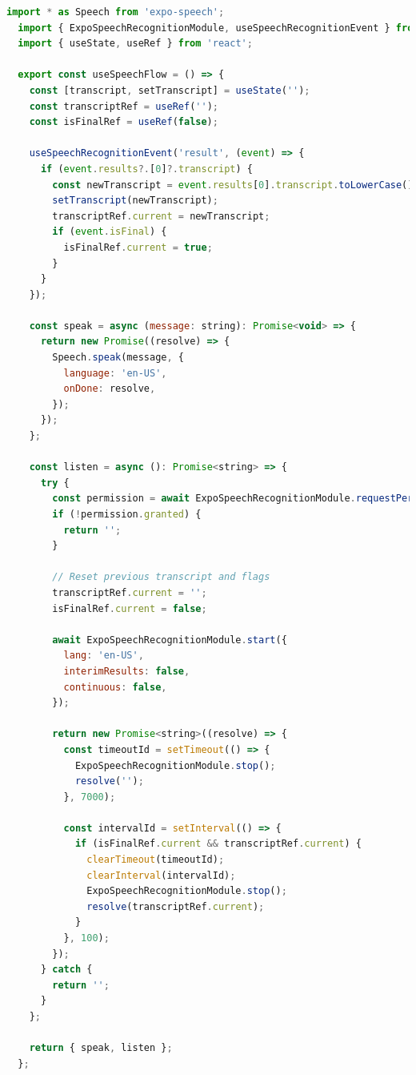 \begin{lstlisting}[language=JavaScript, caption=useSpeechFlowHook, label=lst:hook]
  import * as Speech from 'expo-speech';
  import { ExpoSpeechRecognitionModule, useSpeechRecognitionEvent } from 'expo-speech-recognition';
  import { useState, useRef } from 'react';
  
  export const useSpeechFlow = () => {
    const [transcript, setTranscript] = useState('');
    const transcriptRef = useRef('');
    const isFinalRef = useRef(false);
  
    useSpeechRecognitionEvent('result', (event) => {
      if (event.results?.[0]?.transcript) {
        const newTranscript = event.results[0].transcript.toLowerCase();
        setTranscript(newTranscript);
        transcriptRef.current = newTranscript;
        if (event.isFinal) {
          isFinalRef.current = true;
        }
      }
    });
  
    const speak = async (message: string): Promise<void> => {
      return new Promise((resolve) => {
        Speech.speak(message, {
          language: 'en-US',
          onDone: resolve,
        });
      });
    };
  
    const listen = async (): Promise<string> => {
      try {
        const permission = await ExpoSpeechRecognitionModule.requestPermissionsAsync();
        if (!permission.granted) {
          return '';
        }
  
        // Reset previous transcript and flags
        transcriptRef.current = '';
        isFinalRef.current = false;
  
        await ExpoSpeechRecognitionModule.start({
          lang: 'en-US',
          interimResults: false,
          continuous: false,
        });
  
        return new Promise<string>((resolve) => {
          const timeoutId = setTimeout(() => {
            ExpoSpeechRecognitionModule.stop();
            resolve('');
          }, 7000);
  
          const intervalId = setInterval(() => {
            if (isFinalRef.current && transcriptRef.current) {
              clearTimeout(timeoutId);
              clearInterval(intervalId);
              ExpoSpeechRecognitionModule.stop();
              resolve(transcriptRef.current);
            }
          }, 100);
        });
      } catch {
        return '';
      }
    };
  
    return { speak, listen };
  };
\end{lstlisting}
  
